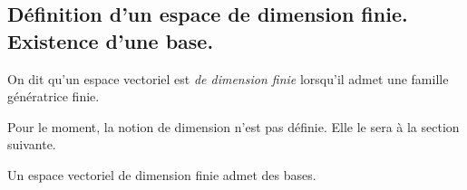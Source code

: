 \subsection{Définition d'un espace de dimension finie. Existence d'une base.}
\begin{defi}
 On dit qu'un espace vectoriel est \emph{de dimension finie} lorsqu'il admet une famille génératrice finie.
\end{defi}
\begin{rem}
 Pour le moment, la notion de dimension n'est pas définie. Elle le sera à la section suivante.
\end{rem}
\begin{propn}
 Un espace vectoriel de dimension finie admet des bases.
\end{propn}
